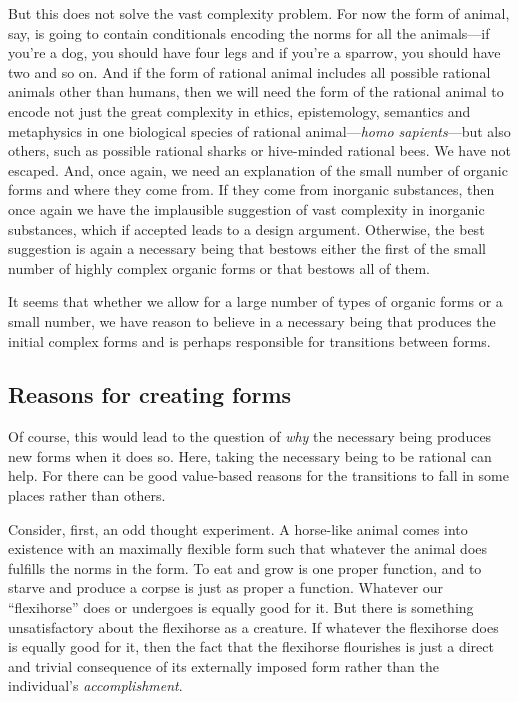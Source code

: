 But this does not solve the vast complexity problem. For now the form of animal, say, is going to contain 
conditionals encoding the norms for all the animals---if you're a dog, you should have four legs and if you're
a sparrow, you should have two and so on. And if the form of rational animal includes all possible rational animals
other than humans, then we will need the form of the rational animal to encode not just the great complexity in 
ethics, epistemology, semantics and metaphysics in one biological species of rational animal---\textit{homo sapients}---but
also others, such as possible rational sharks or hive-minded rational bees. We have not escaped. And, once again,
we need an explanation of the small number of organic forms and where they come from. If they come from inorganic
substances, then once again we have the implausible suggestion of vast complexity in inorganic substances, which
if accepted leads to a design argument. Otherwise, the best suggestion is again a necessary being that bestows
either the first of the small number of highly complex organic forms or that bestows all of them.

It seems that whether we allow for a large number of types of organic forms or a small number, we have reason to
believe in a necessary being that produces the initial complex forms and is perhaps responsible for transitions
between forms.

\subsection{Reasons for creating forms}
Of course, this would lead to the question of \textit{why} the necessary being produces new forms when it does so.
Here, taking the necessary being to be rational can help. For there can be good value-based reasons for the transitions
to fall in some places rather than others. 

Consider, first, an odd thought experiment. A horse-like animal comes into existence with an maximally flexible form such that
whatever the animal does fulfills the norms in the form. To eat and grow is one proper function, and to starve and produce
a corpse is just as proper a function. Whatever our ``flexihorse'' does or undergoes is equally good for it. But there is something unsatisfactory about the flexihorse as a creature. If whatever the flexihorse does is equally good for it, then the fact 
that the flexihorse flourishes is just a direct and trivial consequence of its externally imposed form rather than the individual's 
\textit{accomplishment}. 


